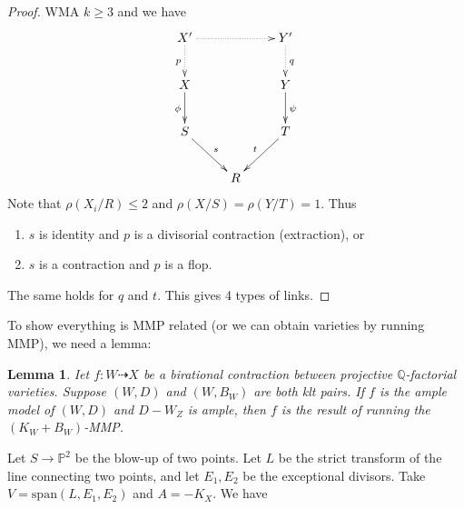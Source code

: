 \documentclass{article}
\newtheorem{lem}[defn]{Lemma}
\begin{document}
\begin{proof}
	WMA $ k\geqslant 3 $ and we have 
	$$ \xymatrix{
	X'\ar@{.>}[d]_p\ar@{.>}[rr]&&Y'\ar@{.>}[d]^q\\
	X\ar[d]_{\phi}&&Y\ar[d]^\psi\\
	S\ar[rd]^s&&T\ar[ld]_t\\
	&R&} $$
Note that $ \rho(X_i/R)\leqslant 2 $ and $ \rho(X/S)=\rho(Y/T)=1 $. Thus 
\begin{enumerate}
	\item $ s $ is identity and $ p $ is a divisorial contraction (extraction), or
	\item $ s $ is a contraction and $ p $ is a flop.
\end{enumerate}
The same holds for $ q $ and $ t $. This gives 4 types of links.
\end{proof}
To show everything is MMP related (or we can obtain varieties by running MMP), we need a lemma:
\begin{lem}
	Iet $ f:W\dashrightarrow X $ be a birational contraction between projective $ \mathbb{Q} $-factorial varieties. Suppose $ (W,D) $ and $ (W,B_W) $ are both klt pairs. If $ f $ is the ample model of $ (W,D) $ and $ D-W_Z $ is ample, then $ f $ is the result of running the $ (K_W+B_W) $-MMP.
\end{lem}
Let $ S\to \mathbb{P}^2 $ be the blow-up of two points. Let $ L $ be the strict transform of the line connecting two points, and let $ E_1 ,E_2$ be the exceptional divisors. Take $ V=\mathrm{span}(L,E_1,E_2) $ and $ A=-K_X $. We have

\end{document}
